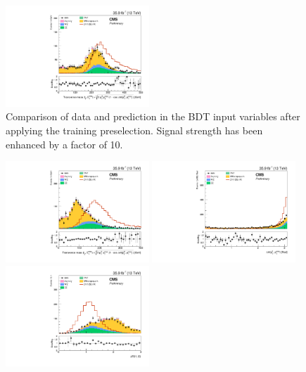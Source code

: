 \begin{figure}[htbp]
\begin{center}
\includegraphics[width=0.48\textwidth]{figures/mva_mTl1MET_nice.pdf}
\caption{Comparison of data and prediction in the BDT input variables after applying the training preselection. Signal strength has been enhanced by a factor of 10.}
\label{fig:bdt_inputvar_histos}
\end{center}
\end{figure}
\begin{figure}[htbp]
\begin{center}
\includegraphics[width=0.48\textwidth]{figures/mva_mTl2MET_nice.pdf}
\includegraphics[width=0.48\textwidth]{figures/mva_delphi_ptll_MET_nice.pdf}
\includegraphics[width=0.48\textwidth]{figures/mva_deltaR_ll_nice.pdf}

\end{center}
\end{figure}
